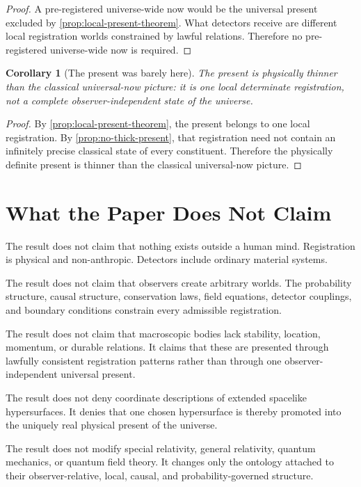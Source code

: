 \documentclass[12pt,onecolumn]{article}
\newtheorem{corollary}[proposition]{Corollary}
\begin{document}
\begin{proof}
A pre-registered universe-wide now would be the universal present excluded by \cref{prop:local-present-theorem}. What detectors receive are different local registration worlds constrained by lawful relations. Therefore no pre-registered universe-wide now is required.
\end{proof}

\begin{corollary}[The present was barely here]
\label{cor:barely-here}
The present is physically thinner than the classical universal-now picture: it is one local determinate registration, not a complete observer-independent state of the universe.
\end{corollary}

\begin{proof}
By \cref{prop:local-present-theorem}, the present belongs to one local registration. By \cref{prop:no-thick-present}, that registration need not contain an infinitely precise classical state of every constituent. Therefore the physically definite present is thinner than the classical universal-now picture.
\end{proof}

\section{What the Paper Does Not Claim}

The result does not claim that nothing exists outside a human mind. Registration is physical and non-anthropic. Detectors include ordinary material systems.

The result does not claim that observers create arbitrary worlds. The probability structure, causal structure, conservation laws, field equations, detector couplings, and boundary conditions constrain every admissible registration.

The result does not claim that macroscopic bodies lack stability, location, momentum, or durable relations. It claims that these are presented through lawfully consistent registration patterns rather than through one observer-independent universal present.

The result does not deny coordinate descriptions of extended spacelike hypersurfaces. It denies that one chosen hypersurface is thereby promoted into the uniquely real physical present of the universe.

The result does not modify special relativity, general relativity, quantum mechanics, or quantum field theory. It changes only the ontology attached to their observer-relative, local, causal, and probability-governed structure.
\end{document}
